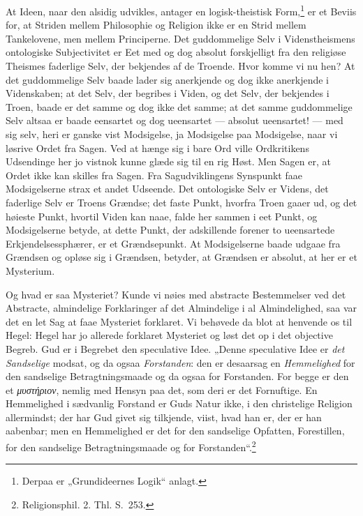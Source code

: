 \documentclass[12pt]{book}
\begin{document}
At Ideen, naar den alsidig udvikles, antager en logisk-theistisk
Form,\footnote{Derpaa er „Grundideernes Logik“ anlagt.} er et Beviis
for, at Striden mellem Philosophie og Religion ikke er en Strid
mellem Tankelovene, men mellem Principerne. Det guddommelige Selv i
Videnstheismens ontologiske Subjectivitet er Eet med og dog absolut
forskjelligt fra den religiøse Theismes
faderlige Selv, der bekjendes af de Troende. Hvor komme vi nu hen?
At det guddommelige Selv baade lader sig anerkjende og dog ikke
anerkjende i Videnskaben; at det Selv, der begribes i Viden, og det
Selv, der bekjendes i Troen, baade er det samme og dog ikke det
samme; at det samme guddommelige Selv altsaa er baade eensartet og
dog ueensartet --- absolut ueensartet! --- med sig selv, heri er
ganske vist Modsigelse, ja Modsigelse paa Modsigelse, naar vi
løsrive Ordet fra Sagen. Ved at hænge sig i bare Ord ville
Ordkritikens Udsendinge her jo vistnok kunne glæde sig til en rig
Høst. Men Sagen er, at Ordet ikke kan skilles fra Sagen. Fra
Sagudviklingens Synspunkt faae Modsigelserne strax et andet
Udseende. Det ontologiske Selv er Videns, det faderlige Selv er
Troens Grændse; det faste Punkt, hvorfra Troen gaaer ud, og det
høieste Punkt, hvortil Viden kan naae, falde her sammen i eet Punkt,
og Modsigelserne betyde, at dette Punkt, der adskillende forener to
ueensartede Erkjendelsessphærer, er et Grændsepunkt. At
Modsigelserne baade udgaae fra Grændsen og opløse sig i Grændsen,
betyder, at Grændsen er absolut, at her er et Mysterium.

Og hvad er saa Mysteriet? Kunde vi nøies med abstracte Bestemmelser
ved det Abstracte, almindelige Forklaringer af det Almindelige i al
Almindelighed, saa var det en let Sag at faae Mysteriet forklaret.
Vi behøvede da blot at henvende os til Hegel: Hegel har jo allerede
forklaret Mysteriet og løst det op i det objective Begreb. Gud er i
Begrebet den speculative Idee. „Denne speculative Idee er \emph{det
Sandselige} modsat, og da ogsaa \emph{Forstanden}: den er desaarsag
en \emph{Hemmelighed} for den sandselige Betragtningsmaade og da
ogsaa for Forstanden. For begge er den et \textit{μυστήριον},
nemlig med Hensyn paa det, som deri er det Fornuftige. En
Hemmelighed i sædvanlig Forstand er Guds Natur
ikke, i den christelige Religion allermindst; der har Gud givet sig
tilkjende, viist, hvad han er, der er han aabenbar; men en
Hemmelighed er det for den sandselige Opfatten, Forestillen, for den
sandselige Betragtningsmaade og for
Forstanden“.\footnote{Religionsphil. 2. Thl. S.\ 253.}
\end{document}

